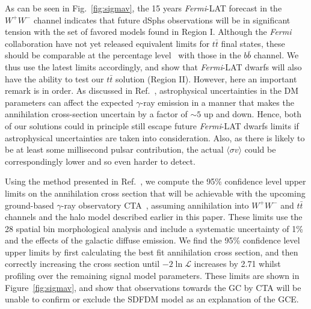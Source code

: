 As can be seen in Fig.~\ref{fig:sigmav}, the 15 years \textit{Fermi}-LAT forecast in the $W^{+}W^{-}$ channel indicates that future dSphs observations will be in significant tension with the set of favored models found in Region I. Although the \textit{Fermi} collaboration have not yet released equivalent limits for $t\bar{t}$ final states, these should be comparable at the percentage level~\cite{Cirelli_cookbook} with those in the $b\bar{b}$ channel. We thus use the latest limits accordingly, and show that \textit{Fermi}-LAT dwarfs will also have the ability to test our $t\bar{t}$ solution (Region II). However, here an important remark is in order. As discussed in Ref.~\cite{Caloreetal:Taleoftails}, astrophysical uncertainties in the DM parameters can affect the expected $\gamma$-ray emission in a manner that makes the annihilation cross-section uncertain by a factor of $\sim 5$ up and down. Hence, both of our solutions could in principle still escape future \textit{Fermi}-LAT dwarfs limits if astrophysical uncertainties are taken into consideration. Also, as there is likely to be at least some millisecond pulsar contribution, the actual $\langle\sigma v\rangle$ could be correspondingly lower and so even harder to detect.     

Using the method presented in Ref.~\cite{Silverwood:2014yza}, we compute the 95\% confidence level upper limits on the annihilation cross section that will be achievable with the upcoming ground-based $\gamma$-ray observatory CTA~\cite{2011ExA....32..193A}, assuming annihilation into $W^+W^-$ and $t\bar{t}$ channels and the halo model described earlier in this paper. These limits use the 28 spatial bin morphological analysis and include a systematic uncertainty of 1\% and the effects of the galactic diffuse emission. We find the 95\% confidence level upper limits by first calculating the best fit annihilation cross section, and then correctly increasing the cross section until $-2 \ln \mathcal{L}$ increases by 2.71 whilst profiling over the remaining signal model parameters. These limits are shown in Figure~\ref{fig:sigmav}, and show that observations towards the GC by CTA will be unable to confirm or exclude the SDFDM model as an explanation of the GCE. 

